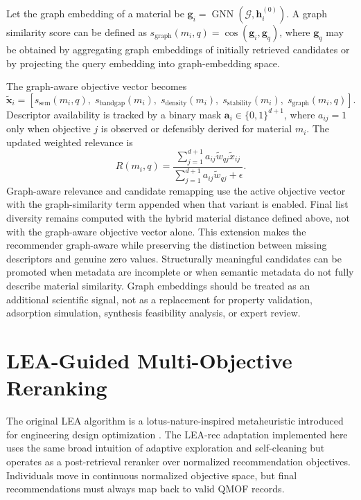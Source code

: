 \documentclass[12pt,a4paper]{article}
\begin{document}
Let the graph embedding of a material be $\mathbf{g}_i = \operatorname{GNN}(\mathcal{G}, \mathbf{h}_i^{(0)})$. A graph similarity score can be defined as $s_{\mathrm{graph}}(m_i, q) = \cos(\mathbf{g}_i, \mathbf{g}_q)$, where $\mathbf{g}_q$ may be obtained by aggregating graph embeddings of initially retrieved candidates or by projecting the query embedding into graph-embedding space.

The graph-aware objective vector becomes
\begin{equation}
  \tilde{\mathbf{x}}_i = [s_{\mathrm{sem}}(m_i,q),\; s_{\mathrm{bandgap}}(m_i),\; s_{\mathrm{density}}(m_i),\; s_{\mathrm{stability}}(m_i),\; s_{\mathrm{graph}}(m_i,q)].
\end{equation}
Descriptor availability is tracked by a binary mask $\mathbf{a}_i \in \{0,1\}^{d+1}$, where $a_{ij}=1$ only when objective $j$ is observed or defensibly derived for material $m_i$. The updated weighted relevance is
\begin{equation}
  R(m_i,q) =
  \frac{\sum_{j=1}^{d+1} a_{ij}\tilde{w}_{qj}\tilde{x}_{ij}}
       {\sum_{j=1}^{d+1} a_{ij}\tilde{w}_{qj}+\epsilon}.
\end{equation}
Graph-aware relevance and candidate remapping use the active objective vector with the graph-similarity term appended when that variant is enabled. Final list diversity remains computed with the hybrid material distance defined above, not with the graph-aware objective vector alone. This extension makes the recommender graph-aware while preserving the distinction between missing descriptors and genuine zero values. Structurally meaningful candidates can be promoted when metadata are incomplete or when semantic metadata do not fully describe material similarity. Graph embeddings should be treated as an additional scientific signal, not as a replacement for property validation, adsorption simulation, synthesis feasibility analysis, or expert review.

\section{LEA-Guided Multi-Objective Reranking}
\label{sec:lea}

The original LEA algorithm is a lotus-nature-inspired metaheuristic introduced for engineering design optimization \cite{dalirinia2024}. The LEA-rec adaptation implemented here uses the same broad intuition of adaptive exploration and self-cleaning but operates as a post-retrieval reranker over normalized recommendation objectives. Individuals move in continuous normalized objective space, but final recommendations must always map back to valid QMOF records.
\end{document}
